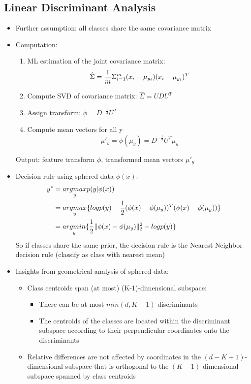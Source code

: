 \subsection*{Linear Discriminant Analysis}
\begin{itemize}
    \item
        Further assumption: all classes share the same covariance matrix
    \item
        Computation:
        \begin{enumerate}
            \item
                ML estimation of the joint covariance matrix:
                $$\hat{\Sigma} = \frac{\displaystyle 1}{\displaystyle m} \Sigma_{i=1}^m (x_i - \mu_{y_i}) (x_i - \mu_{y_i})^T$$
            \item
                Compute SVD of covariance matrix: $\hat{\Sigma} = UDU^T$
            \item
                Assign transform: $\phi = D^{-\frac{1}{2}}U^T$
            \item
                Compute mean vectors for all y
                $$ \mu'_y = \phi(\mu_y) = D^{-\frac{1}{2}}U^T \mu_y $$
        \end{enumerate}
        Output: feature transform $\phi$, transformed mean vectors $\mu'_y$
    \item
        Decision rule using sphered data $\phi(x)$:
        \begin{align*}
            y^* &= \underset{y}{argmax} p(y|\phi(x)) \\
            &= \underset{y}{argmax} \{log p(y) - \frac{\displaystyle 1}{\displaystyle 2} (\phi(x) - \phi(\mu_y))^T  (\phi(x) - \phi(\mu_y)) \} \\
            &= \underset{y}{argmin} \{ \frac{\displaystyle 1}{\displaystyle 2} \lVert\phi(x) - \phi(\mu_y)\rVert_2^2 - log p(y) \}
        \end{align*}
        So if classes share the same prior, the decision rule is the Nearest Neighbor decision rule (classify as class with nearest mean)
    \item
        Insights from geometrical analysis of sphered data:
        \begin{itemize}
            \item
                Class centroids span (at most) (K-1)-dimensional subspace:
                \begin{itemize}
                    \item
                        There can be at most $min(d, K-1)$ discriminants
                    \item
                        The centroids of the classes are located within the discriminant subspace according to their perpendicular coordinates onto the discriminants
                \end{itemize}

            \item
                Relative differences are not affected by coordinates in the $(d - K + 1)$-dimensional subspace that is orthogonal to the $(K-1)$-dimensional subspace spanned by class centroids

        \end{itemize}

\end{itemize}

